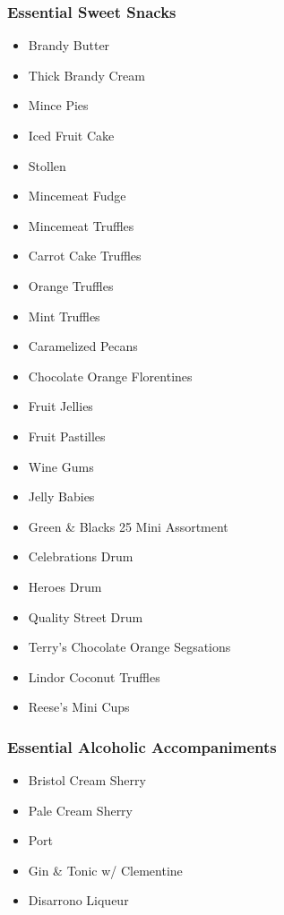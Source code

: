 \documentclass[11pt, english]{article}
\begin{document}
		\subsubsection*{Essential Sweet Snacks}

	\begin{itemize}
	\setlength\itemsep{0cm}
		\item Brandy Butter
		\item Thick Brandy Cream
		\item Mince Pies
		\item Iced Fruit Cake
		\item Stollen
		\item Mincemeat Fudge
		\item Mincemeat Truffles
		\item Carrot Cake Truffles
		\item Orange Truffles
		\item Mint Truffles
		\item Caramelized Pecans
		\item Chocolate Orange Florentines
		\item Fruit Jellies
		\item Fruit Pastilles
		\item Wine Gums
		\item Jelly Babies
		\item Green \& Blacks 25 Mini Assortment
		\item Celebrations Drum
		\item Heroes Drum
		\item Quality Street Drum
		\item Terry's Chocolate Orange Segsations
		\item Lindor Coconut Truffles
		\item Reese's Mini Cups
	\end{itemize}

		\subsubsection*{Essential Alcoholic Accompaniments}

	\begin{itemize}
        \setlength\itemsep{0cm}
		\item Bristol Cream Sherry
		\item Pale Cream Sherry
		\item Port
		\item Gin \& Tonic w/ Clementine
		\item Disarrono Liqueur
	\end{itemize}
\end{document}
